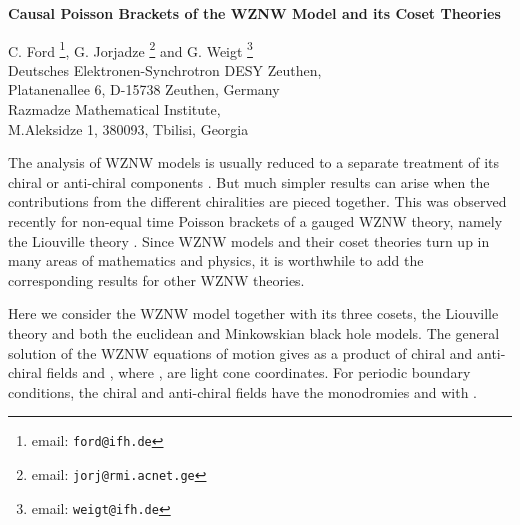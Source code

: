 \documentclass[a4paper,12pt]{article}
\renewcommand{\title}[1]{\begin{center}\bf\Large #1\end{center}}
\renewcommand{\author}[1]{\begin{center}\large #1\end{center}}
\providecommand{\rr}{\mathbb{R}}
\begin{document}
\title{Causal Poisson Brackets of the \myHighlight{$SL(2,\rr)$}\coordHE{} WZNW Model
  and its Coset Theories}
\author{
C. Ford\coordHE{}
\footnote{email: \tt ford@ifh.de},
 G. Jorjadze\myHighlight{${}^b$}\coordHE{}
\footnote{email: \tt jorj@rmi.acnet.ge}
 and G. Weigt\myHighlight{${}^a$}\coordHE{}
\footnote{email: \tt weigt@ifh.de}\\
{\small\myHighlight{${}^a$}\coordHE{} Deutsches Elektronen-Synchrotron DESY Zeuthen,\\
    Platanenallee 6, D-15738 Zeuthen, Germany}\\
{\small\myHighlight{${}^b$}\coordHE{}Razmadze Mathematical Institute,}\\
  {\small M.Aleksidze 1, 380093, Tbilisi, Georgia}}




\begin{abstract}
From the basic chiral and anti-chiral Poisson bracket algebra of the
\myHighlight{$SL(2,\rr)$}\coordHE{} WZNW model, non-equal time  Poisson brackets are derived.
Through Hamiltonian reduction we deduce the corresponding brackets
for its coset theories.
\end{abstract}

\baselineskip=20pt

\vspace{0.3cm}

The analysis of WZNW models is usually reduced to a separate treatment
of its chiral or anti-chiral components \cite{Goddard, Gawedzki, BFP}.
But much simpler results can arise when the contributions from the
different chiralities are pieced together.  This was observed recently
for non-equal time Poisson brackets of a gauged WZNW theory, namely
the Liouville theory \cite{JW}. Since WZNW models and their coset
theories turn up in many areas of mathematics and physics, it is
worthwhile to add the corresponding results for other WZNW theories.


Here we consider the \myHighlight{$SL(2,\rr)$}\coordHE{} WZNW model together with its three
cosets, the Liouville theory and both the euclidean and Minkowskian
black hole models.  The general solution of the WZNW equations of
motion gives \coordHE{} as a product of chiral and anti-chiral
fields \coordHE{} and \coordHE{}, where \coordHE{}, \coordHE{} are light cone coordinates.  For periodic boundary
conditions, the chiral and anti-chiral fields have the monodromies
\coordHE{} and \coordHE{} with
\myHighlight{$M\in SL(2,\rr)$}\coordHE{}.
\end{document}

